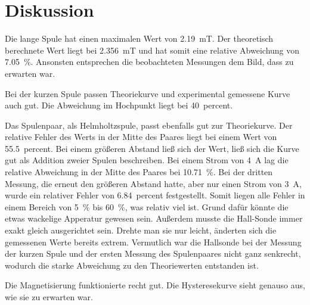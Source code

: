 \section{Diskussion}
\label{sec:Diskussion}

Die lange Spule hat einen maximalen Wert von \SI{2.19}{\milli\tesla}. Der theoretisch berechnete Wert liegt bei %
\SI{2.356}{\milli\tesla} und hat somit eine relative Abweichung von \SI{7.05}{\percent}. Ansonsten entsprechen die 
beobachteten Messungen dem Bild, dass zu erwarten war.

\noindent Bei der kurzen Spule passen Theoriekurve und experimental gemessene Kurve auch gut. Die Abweichung im 
Hochpunkt liegt bei \SI{40}{percent}. 

\noindent Das Spulenpaar, als Helmholtzspule, passt ebenfalls gut zur Theoriekurve. Der relative Fehler des Werts in der Mitte 
des Paares liegt bei einem Wert von \SI{55.5}{percent}.
Bei einem größeren Abstand ließ sich der Wert, ließ sich die Kurve gut als Addition zweier Spulen beschreiben. Bei %
einem Strom von \SI{4}{\ampere} lag die relative Abweichung in der Mitte des Paares bei \SI{10.71}{\percent}. %
Bei der dritten Messung, die erneut den größeren Abstand hatte, aber nur einen Strom von \SI{3}{\ampere}, wurde ein %
relativer Fehler von \SI{6.84}{percent} festgestellt. Somit liegen alle Fehler in einem Bereich von \SI{5}{\percent} 
bis \SI{60}{\percent}, was relativ viel ist. Grund dafür könnte die etwas wackelige Apperatur gewesen sein. %
Außerdem musste die Hall-Sonde immer exakt gleich ausgerichtet sein. Drehte man sie nur leicht, änderten sich die %
gemessenen Werte bereits extrem.
\newline
Vermutlich war die Hallsonde bei der Messung der kurzen Spule und der ersten Messung %
des Spulenpaares nicht ganz senkrecht, wodurch die starke Abweichung zu den Theoriewerten entstanden ist. 

\noindent Die Magnetisierung funktionierte recht gut. Die Hysteresekurve sieht genauso aus, wie sie zu erwarten war. %
